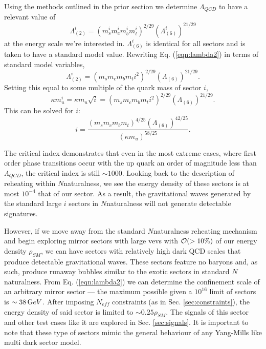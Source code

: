 \documentclass[nofootinbib,twocolumn,preprintnumbers]{revtex4-2}
\begin{document}
Using the methods outlined in the prior section we determine $\Lambda_{QCD}$ to have a relevant value of 
\begin{equation}\label{eqn:lambda2}
\Lambda^i_{(2)} = (m_s^i m_c^i m_b^i m_t^i)^{2/29}(\Lambda^i_{(6)})^{21/29}
\end{equation} 
at the energy scale we're interested in. $\Lambda^i_{(6)}$ is identical for all sectors and is taken to have a standard model value. Rewriting Eq. (\ref{eqn:lambda2}) in terms of standard model variables, 
\begin{equation}\label{eqn:lambda2adj}
\Lambda^i_{(2)} = (m_s m_c m_b m_t i^2)^{2/29}(\Lambda_{(6)})^{21/29}.
\end{equation}
Setting this equal to some multiple of the quark mass of sector $i$,
\begin{equation}
\kappa m^i_u = \kappa m_u \sqrt{i} = (m_s m_c m_b m_t i^2)^{2/29}(\Lambda_{(6)})^{21/29}.
\end{equation}
This can be solved for $i$:
\begin{equation}\label{eqn:critIndex}
i = \frac{(m_s m_c m_b m_t)^{4/25}(\Lambda_{(6)})^{42/25}}{(\kappa m_u)^{58/25}}.
\end{equation}
 
The critical index demonstrates that even in the most extreme cases, where first order phase transitions occur with the up quark an order of magnitude less than $\Lambda_{QCD}$, the critical index is still $\sim 1000$. Looking back to the description of reheating within $N$naturalness, we see the energy density of these sectors is at most $10^{-4}$ that of our sector. As a result, the gravitational waves generated by the standard large $i$ sectors in $N$naturalness will not generate detectable signatures. 

However, if we move away from the standard $N$naturalness reheating mechanism and begin exploring mirror sectors with large vevs with ${\cal O}( >10\%)$ of our energy density $\rho_{SM}$, we can have sectors with relatively high dark QCD scales that produce detectable gravitational waves. These sectors feature no baryons and, as such, produce runaway bubbles similar to the exotic sectors in standard $N$naturalness. From Eq. (\ref{eqn:lambda2}) we can determine the confinement scale of an arbitrary mirror sector --- the maximum possible given a $10^{16}$ limit \cite{Arkani-Hamed:2016rle} of sectors is $\sim 38 \,{\mathrm GeV}$. After imposing $N_{eff}$ constraints (as in Sec. \ref{sec:constraints}), the energy density of said sector is limited to $\sim 0.25\rho_{SM}$. The signals of this sector and other test cases like it are explored in Sec. \ref{sec:signals}. It is important to note that these type of sectors mimic the general behaviour of any Yang-Mills like multi dark sector model.
\end{document}

